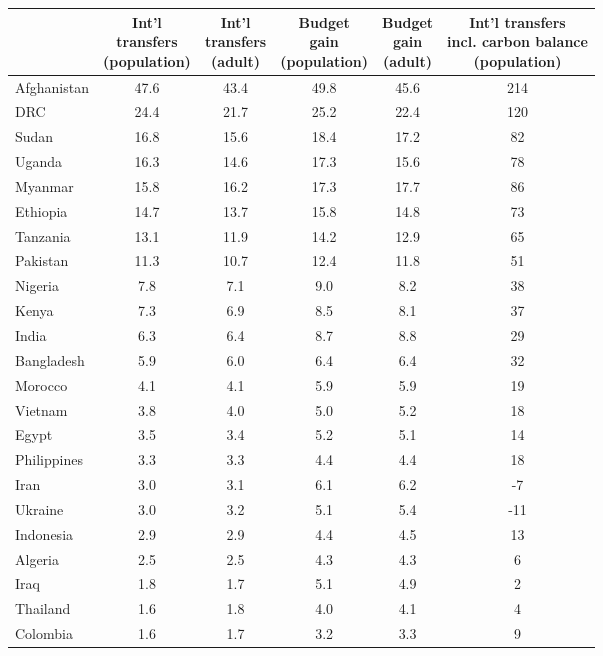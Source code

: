 
\begin{tabular}[t]{lccccc}
\toprule
  & \makecell{Int'l\\transfers\\(population)} & \makecell{Int'l\\transfers\\(adult)} & \makecell{Budget\\gain\\(population)} & \makecell{Budget\\gain\\(adult)} & \makecell{Int'l transfers\\incl. carbon balance\\(population)}\\
\midrule
Afghanistan & 47.6 & 43.4 & 49.8 & 45.6 & 214\\
DRC & 24.4 & 21.7 & 25.2 & 22.4 & 120\\
Sudan & 16.8 & 15.6 & 18.4 & 17.2 & 82\\
Uganda & 16.3 & 14.6 & 17.3 & 15.6 & 78\\
Myanmar & 15.8 & 16.2 & 17.3 & 17.7 & 86\\
Ethiopia & 14.7 & 13.7 & 15.8 & 14.8 & 73\\
Tanzania & 13.1 & 11.9 & 14.2 & 12.9 & 65\\
Pakistan & 11.3 & 10.7 & 12.4 & 11.8 & 51\\
Nigeria & 7.8 & 7.1 & 9.0 & 8.2 & 38\\
Kenya & 7.3 & 6.9 & 8.5 & 8.1 & 37\\
India & 6.3 & 6.4 & 8.7 & 8.8 & 29\\
Bangladesh & 5.9 & 6.0 & 6.4 & 6.4 & 32\\
Morocco & 4.1 & 4.1 & 5.9 & 5.9 & 19\\
Vietnam & 3.8 & 4.0 & 5.0 & 5.2 & 18\\
Egypt & 3.5 & 3.4 & 5.2 & 5.1 & 14\\
Philippines & 3.3 & 3.3 & 4.4 & 4.4 & 18\\
Iran & 3.0 & 3.1 & 6.1 & 6.2 & -7\\
Ukraine & 3.0 & 3.2 & 5.1 & 5.4 & -11\\
Indonesia & 2.9 & 2.9 & 4.4 & 4.5 & 13\\
Algeria & 2.5 & 2.5 & 4.3 & 4.3 & 6\\
Iraq & 1.8 & 1.7 & 5.1 & 4.9 & 2\\
Thailand & 1.6 & 1.8 & 4.0 & 4.1 & 4\\
Colombia & 1.6 & 1.7 & 3.2 & 3.3 & 9\\

\end{tabular}

